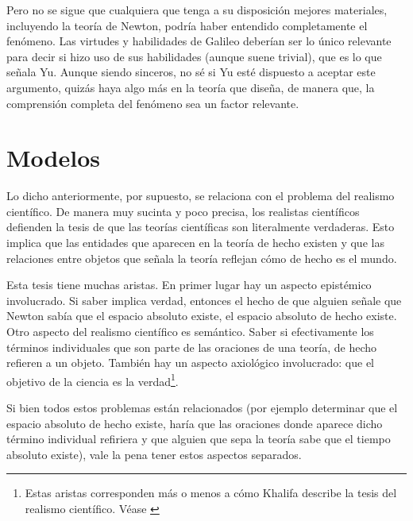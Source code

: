 Pero no se sigue que cualquiera que tenga a su disposición mejores materiales, incluyendo la teoría de Newton, podría haber entendido completamente el fenómeno. Las virtudes y habilidades de Galileo deberían ser lo único relevante para decir si hizo uso de sus habilidades (aunque suene trivial), que es lo que señala Yu. Aunque siendo sinceros, no sé si Yu esté dispuesto a aceptar este argumento, quizás haya algo más en la teoría que diseña, de manera que, la comprensión completa del fenómeno sea un factor relevante.


\section{Modelos}

Lo dicho anteriormente, por supuesto, se relaciona con el problema del realismo científico. De manera muy sucinta y poco precisa, los realistas científicos defienden la tesis de que las teorías científicas son literalmente verdaderas. Esto implica que las entidades que aparecen en la teoría de hecho existen y que las relaciones entre objetos que señala la teoría reflejan cómo de hecho es el mundo.

Esta tesis tiene muchas aristas. En primer lugar hay un aspecto epistémico involucrado. Si saber implica verdad, entonces el hecho de que alguien señale que Newton sabía que el espacio absoluto existe, el espacio absoluto de hecho existe. Otro aspecto del realismo científico es semántico. Saber si efectivamente los términos individuales que son parte de las oraciones de una teoría, de hecho refieren a un objeto. También hay un aspecto axiológico involucrado: que el objetivo de la ciencia es la verdad\footnote{Estas aristas corresponden más o menos a cómo Khalifa describe la tesis del realismo científico. Véase \citeyear{Khalifa2010-KHASCA}}.

Si bien todos estos problemas están relacionados (por ejemplo determinar que el espacio absoluto de hecho existe, haría que las oraciones donde aparece dicho término individual refiriera y que alguien que sepa la teoría sabe que el tiempo absoluto existe), vale la pena tener estos aspectos separados. 

